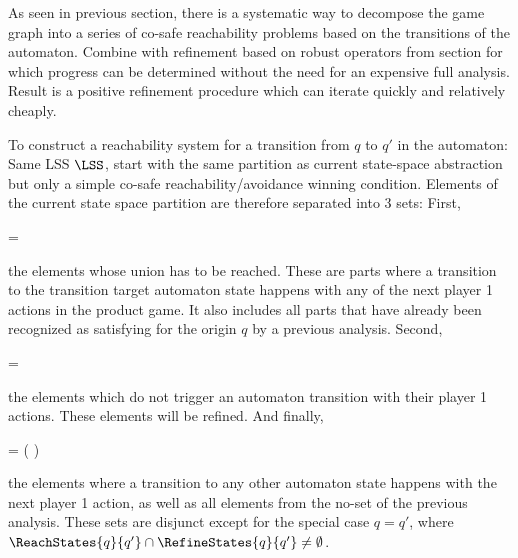 As seen in previous section, there is a systematic way to decompose the game graph into a series of co-safe reachability problems based on the transitions of the automaton.
Combine with refinement based on robust operators from section  for which progress can be determined without the need for an expensive full analysis.
Result is a positive refinement procedure which can iterate quickly and relatively cheaply.


\startsubsection[title={Decomposition}]

    To construct a reachability system for a transition from $q$ to $q'$ in the automaton:
    Same LSS $\LSS$, start with the same partition as current state-space abstraction but only a simple co-safe reachability/avoidance winning condition.
    Elements of the current state space partition are therefore separated into 3 sets:
    First,

    \startformula
         =  \EndComma
    \stopformula

    the elements whose union has to be reached.
    These are parts where a transition to the transition target automaton state happens with any of the next player 1 actions in the product game.
    It also includes all parts that have already been recognized as satisfying for the origin $q$ by a previous analysis.
    Second,

    \startformula
         =  \EndComma
    \stopformula

    the elements which do not trigger an automaton transition with their player 1 actions.
    These elements will be refined.
    And finally,

    \startformula
         =  \setminus \left(  \cup {} \right) \EndComma
    \stopformula

    the elements where a transition to any other automaton state happens with the next player 1 action, as well as all elements from the no-set of the previous analysis.
    These sets are disjunct except for the special case $q = q'$, where $\ReachStates{q}{q'} \cap \RefineStates{q}{q'} \ne \emptyset$.

\stopsubsection


